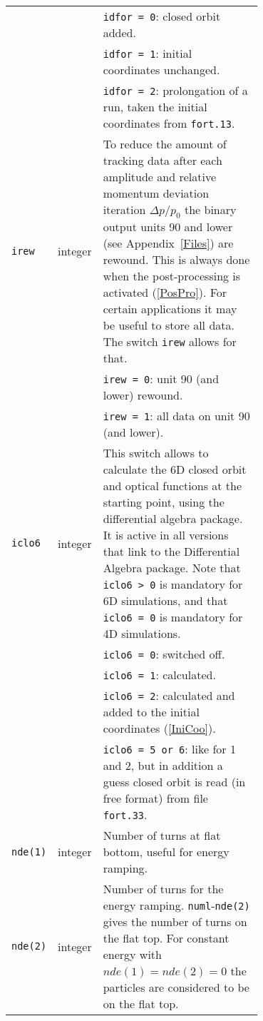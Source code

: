 \begin{longtabu}{@{}llp{0.7\linewidth}}
                           &          & \texttt{idfor = 0}: closed orbit added. \\
                           &          & \texttt{idfor = 1}: initial coordinates unchanged. \\
                           &          & \texttt{idfor = 2}: prolongation of a run, taken the initial coordinates from \texttt{fort.13}. \\
    \texttt{irew}          & integer  & To reduce the amount of tracking data after each amplitude and relative momentum deviation iteration $\Delta p/p_0$ the binary output units 90 and lower (see Appendix~\ref{Files}) are rewound. This is always done when the post-processing is activated (\ref{PosPro}). For certain applications it may be useful to store all data. The switch \texttt{irew} allows for that. \\
                           &          & \texttt{irew = 0}: unit 90 (and lower) rewound. \\
                           &          & \texttt{irew = 1}: all data on unit 90 (and lower). \\
    \texttt{iclo6}         & integer  & This switch allows to calculate the 6D closed orbit and optical functions at the starting point, using the differential algebra package. It is active in all versions that link to the Differential Algebra package.  Note that \texttt{iclo6 > 0} is mandatory for 6D simulations, and that \texttt{iclo6 = 0} is mandatory for 4D simulations. \\
                           &          & \texttt{iclo6 = 0}: switched off. \\
                           &          & \texttt{iclo6 = 1}: calculated. \\
                           &          & \texttt{iclo6 = 2}: calculated and added to the initial coordinates (\ref{IniCoo}). \\
                           &          & \texttt{iclo6 = 5 or 6}: like for 1 and 2, but in addition a guess closed orbit is read (in free format) from file \texttt{fort.33}. \\
    \texttt{nde(1)}        & integer  & Number of turns at flat bottom, useful for energy ramping. \\
    \texttt{nde(2)}        & integer  & Number of turns for the energy ramping. \texttt{numl}-\texttt{nde(2)} gives the number of turns on the flat top. For constant energy with \mbox{$nde(1) = nde(2) = 0$} the particles are considered to be on the flat top. \\

\end{longtabu}
